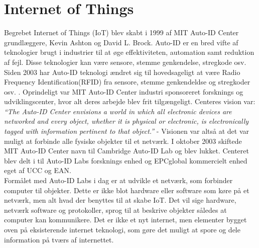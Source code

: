     \section{Internet of Things}
        Begrebet Internet of Things (IoT) blev skabt i 1999 af MIT Auto-ID Center grundlæggere, Kevin Ashton og David L. Brock.\autocite{Hashmi2017} Auto-ID er en bred vifte af teknologier brugt i industrier til at øge effektiviteten, automation samt reduktion af fejl. Disse teknologier kan være sensore, stemme genkendelse, stregkode osv.
        Siden 2003 har Auto-ID teknologi ændret sig til hovedsageligt at være Radio Frequency Identification(RFID) fra sensore, stemme genkendeldse og stregkoder osv.\autocite{Sundmaeker2010} . Oprindeligt var MIT Auto-ID Center industri sponsoreret forsknings og udviklingscenter, hvor alt deres arbejde blev frit tilgængeligt. Centeres vision var:\\
        \textit{``The Auto-ID Center envisions a world in which all electronic devices are networked and every object, whether it is physical or electronic, is electronically tagged with information pertinent to that object.''} -\autocite[Kapitel 2,p. ~4]{Sarma2001} Visionen var altså at det var muligt at forbinde alle fysiske objekter til et netværk. 
        I oktober 2003 skiftede MIT Auto-ID Center navn til Cambridge Auto-ID Lab og blev lukket. Centeret blev delt i til Auto-ID Labs forsknings enhed og EPCglobal kommercielt enhed eget af UCC og EAN.\autocite{Sundmaeker2010}\\
        Formålet med Auto-ID Labs i dag er at udvikle et netværk, som forbinder computer til objekter. Dette er ikke blot hardware eller software som køre på et netværk, men alt hvad der benyttes til at skabe IoT. Det vil sige hardware, netværk software og protokoller, sprog til at beskrive objekter således at computer kan kommunikere. Det er ikke et nyt internet, men elementer bygget oven på eksisterende internet teknologi, som gøre det muligt at spore og dele information på tværs af internettet.\autocite{Sundmaeker2010} \\
